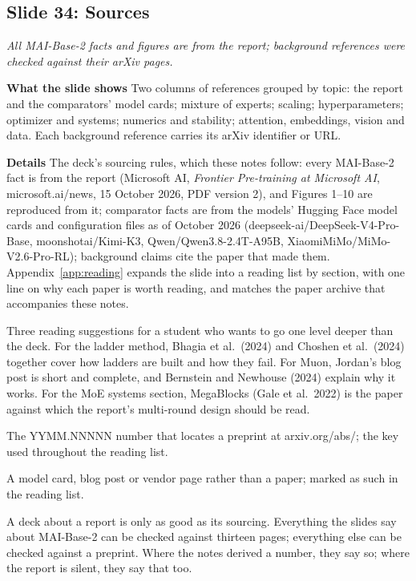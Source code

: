 \documentclass[11pt,letterpaper]{article}
\newcommand{\setstage}[1]{\colorlet{stagec}{#1}}
\newcommand{\slide}[3]{%
  \subsection[Slide #1: #2]{Slide #1: #2}%
  {\color{muted}\itshape #3\par}\medskip}
\newcommand{\para}[1]{\medskip\noindent\textbf{#1}\quad}
\newenvironment{terms}{\begin{tcolorbox}[termsbox]\begin{description}[leftmargin=1.1em,itemsep=3pt,topsep=2pt,font=\normalfont]}{\end{description}\end{tcolorbox}}
\newcommand{\term}[2]{\item[\textbf{#1}]\index{#1} #2}
\newenvironment{intuition}{\begin{tcolorbox}[intuitionbox]}{\end{tcolorbox}}
\begin{document}
\slide{34}{Sources}{All MAI-Base-2 facts and figures are from the report; background references were checked against their arXiv pages.}

\para{What the slide shows} Two columns of references grouped by topic: the report and the comparators' model cards; mixture of experts; scaling; hyperparameters; optimizer and systems; numerics and stability; attention, embeddings, vision and data. Each background reference carries its arXiv identifier or URL.

\para{Details} The deck's sourcing rules, which these notes follow: every MAI-Base-2 fact is from the report (Microsoft AI, \emph{Frontier Pre-training at Microsoft AI}, microsoft.ai/news, 15 October 2026, PDF version 2), and Figures 1--10 are reproduced from it; comparator facts are from the models' Hugging Face model cards and configuration files as of October 2026 (deepseek-ai/DeepSeek-V4-Pro-Base, moonshotai/Kimi-K3, Qwen/Qwen3.8-2.4T-A95B, XiaomiMiMo/MiMo-V2.6-Pro-RL); background claims cite the paper that made them. Appendix~\ref{app:reading} expands the slide into a reading list by section, with one line on why each paper is worth reading, and matches the paper archive that accompanies these notes.

Three reading suggestions for a student who wants to go one level deeper than the deck. For the ladder method, Bhagia et al.\ (2024) and Choshen et al.\ (2024) together cover how ladders are built and how they fail. For Muon, Jordan's blog post is short and complete, and Bernstein and Newhouse (2024) explain why it works. For the MoE systems section, MegaBlocks (Gale et al.\ 2022) is the paper against which the report's multi-round design should be read.

\begin{terms}
\term{arXiv identifier}{The YYMM.NNNNN number that locates a preprint at arxiv.org/abs/; the key used throughout the reading list.}
\term{secondary source}{A model card, blog post or vendor page rather than a paper; marked as such in the reading list.}
\end{terms}

\begin{intuition}
A deck about a report is only as good as its sourcing. Everything the slides say about MAI-Base-2 can be checked against thirteen pages; everything else can be checked against a preprint. Where the notes derived a number, they say so; where the report is silent, they say that too.
\end{intuition}
\clearpage
\appendix
\setstage{ink}
\end{document}
